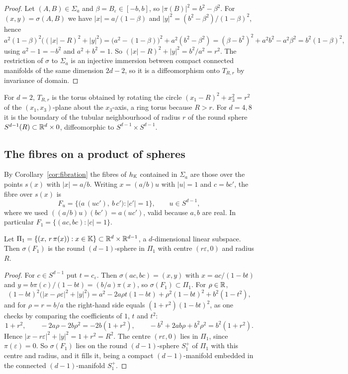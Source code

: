 \begin{proof}
Let $(A,B)\in\Sigma_a$ and $\beta=B_\varepsilon\in[-b,b]$, so $|\pi(B)|^2=b^2-\beta^2$. For $(x,y)=\sigma(A,B)$ we have $|x|=a/(1-\beta)$ and $|y|^2=(b^2-\beta^2)/(1-\beta)^2$, hence
\[
a^2(1-\beta)^2\bigl((|x|-R)^2+|y|^2\bigr)=\bigl(a^2-(1-\beta)\bigr)^2+a^2(b^2-\beta^2)=(\beta-b^2)^2+a^2b^2-a^2\beta^2=b^2(1-\beta)^2,
\]
using $a^2-1=-b^2$ and $a^2+b^2=1$. So $(|x|-R)^2+|y|^2=b^2/a^2=r^2$. The restriction of $\sigma$ to $\Sigma_a$ is an injective immersion between compact connected manifolds of the same dimension $2d-2$, so it is a diffeomorphism onto $T_{R,r}$ by invariance of domain.
\end{proof}

For $d=2$, $T_{R,r}$ is the torus obtained by rotating the circle $(x_1-R)^2+x_3^2=r^2$ of the $(x_1,x_3)$-plane about the $x_3$-axis, a ring torus because $R>r$. For $d=4,8$ it is the boundary of the tubular neighbourhood of radius $r$ of the round sphere $S^{d-1}(R)\subset\mathbb{R}^d\times0$, diffeomorphic to $S^{d-1}\times S^{d-1}$.

\subsection{The fibres on a product of spheres}\label{sec:villfibres}

By Corollary~\ref{cor:fibration} the fibres of $h_{\mathbb{K}}$ contained in $\Sigma_a$ are those over the points $s(x)$ with $|x|=a/b$. Writing $x=(a/b)u$ with $|u|=1$ and $c=bc'$, the fibre over $s(x)$ is
\begin{equation}\label{eq:Fu}
F_u=\bigl\{\bigl(a\,(uc'),\ b\,c'\bigr):|c'|=1\bigr\},\qquad u\in S^{d-1},
\end{equation}
where we used $((a/b)u)(bc')=a(uc')$, valid because $a,b$ are real. In particular $F_1=\{(ac,bc):|c|=1\}$.

\begin{proposition}\label{prop:basefibre}
Let $\Pi_1=\{(x,\,r\,\pi(x)):x\in\mathbb{K}\}\subset\mathbb{R}^d\times\mathbb{R}^{d-1}$, a $d$-dimensional linear subspace. Then $\sigma(F_1)$ is the round $(d-1)$-sphere in $\Pi_1$ with centre $(r\varepsilon,0)$ and radius $R$.
\end{proposition}

\begin{proof}
For $c\in S^{d-1}$ put $t=c_\varepsilon$. Then $\sigma(ac,bc)=(x,y)$ with $x=ac/(1-bt)$ and $y=b\pi(c)/(1-bt)=(b/a)\pi(x)$, so $\sigma(F_1)\subset\Pi_1$. For $\rho\in\mathbb{R}$,
\[
(1-bt)^2\bigl(|x-\rho\varepsilon|^2+|y|^2\bigr)=a^2-2a\rho t(1-bt)+\rho^2(1-bt)^2+b^2(1-t^2),
\]
and for $\rho=r=b/a$ the right-hand side equals $(1+r^2)(1-bt)^2$, as one checks by comparing the coefficients of $1$, $t$ and $t^2$:
\[
1+r^2,\qquad -2a\rho-2b\rho^2=-2b(1+r^2),\qquad -b^2+2ab\rho+b^2\rho^2=b^2(1+r^2).
\]
Hence $|x-r\varepsilon|^2+|y|^2=1+r^2=R^2$. The centre $(r\varepsilon,0)$ lies in $\Pi_1$, since $\pi(\varepsilon)=0$. So $\sigma(F_1)$ lies on the round $(d-1)$-sphere $S_1^+$ of $\Pi_1$ with this centre and radius, and it fills it, being a compact $(d-1)$-manifold embedded in the connected $(d-1)$-manifold $S_1^+$.
\end{proof}

